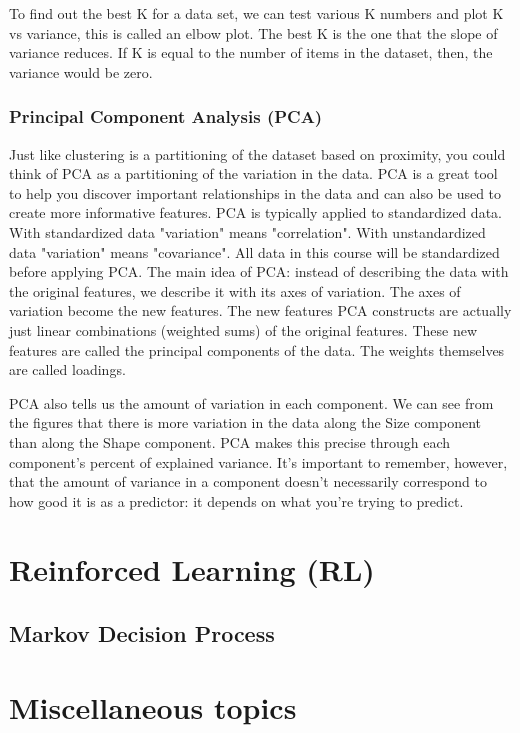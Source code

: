 \documentclass[12pt]{report}
\begin{document}
To find out the best K for a data set, we can test various K numbers and plot K vs variance, this is called an elbow plot. The best K is the one that the slope of variance reduces. If K is equal to the number of items in the dataset, then, the variance would be zero.


\subsection{Principal Component Analysis (PCA)}
Just like clustering is a partitioning of the dataset based on proximity, you could think of PCA as a partitioning of the variation in the data. PCA is a great tool to help you discover important relationships in the data and can also be used to create more informative features. PCA is typically applied to standardized data. With standardized data "variation" means "correlation". With unstandardized data "variation" means "covariance". All data in this course will be standardized before applying PCA. The main idea of PCA: instead of describing the data with the original features, we describe it with its axes of variation. The axes of variation become the new features. The new features PCA constructs are actually just linear combinations (weighted sums) of the original features. These new features are called the principal components of the data. The weights themselves are called loadings.

PCA also tells us the amount of variation in each component. We can see from the figures that there is more variation in the data along the Size component than along the Shape component. PCA makes this precise through each component's percent of explained variance. It's important to remember, however, that the amount of variance in a component doesn't necessarily correspond to how good it is as a predictor: it depends on what you're trying to predict.




\chapter[Reinforced Learning]{Reinforced Learning (RL)}

\section{Markov Decision Process}

\chapter[Miscellaneous topics]{Miscellaneous topics}
\end{document}
